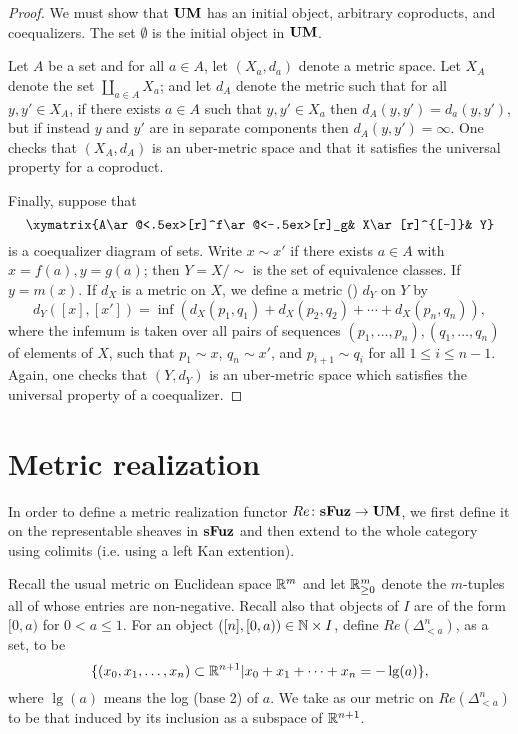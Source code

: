 \documentclass{amsart}
\def\UM{{\bf UM}}
\def\sFuz{{\bf sFuz}}
\begin{document}
\begin{proof}

We must show that $\UM$ has an initial object, arbitrary coproducts, and coequalizers.  The set $\emptyset$ is the initial object in $\UM$.  

Let $A$ be a set and for all $a\in A$, let $(X_a,d_a)$ denote a metric space.  Let $X_A$ denote the set $\coprod_{a\in A}X_a$; and let $d_A$ denote the metric such that for all $y,y'\in X_A$, if there exists $a\in A$ such that $y,y'\in X_a$ then $d_A(y,y')=d_a(y,y')$, but if instead $y$ and $y'$ are in separate components then $d_A(y,y')=\infty$.  One checks that $(X_A,d_A)$ is an uber-metric space and that it satisfies the universal property for a coproduct.

Finally, suppose that $$\xymatrix{A\ar@<.5ex>[r]^f\ar@<-.5ex>[r]_g& X\ar[r]^{[-]}& Y}$$ is a coequalizer diagram of sets.  Write $x\sim x'$ if there exists $a\in A$ with $x=f(a), y=g(a)$; then $Y=X/\sim$ is the set of equivalence classes.  If $y=m(x)$.   If $d_X$ is a metric on $X$, we define a metric (\cite{Wik}) $d_Y$ on $Y$ by $$d_Y([x],[x'])=\inf(d_X(p_1,q_1)+d_X(p_2,q_2)+\cdots+d_X(p_n,q_n)),$$ where the infemum is taken over all pairs of sequences $(p_1,\ldots,p_n), (q_1,\ldots,q_n)$ of elements of $X$, such that $p_1\sim x$, $q_n\sim x'$, and $p_{i+1}\sim q_i$ for all $1\leq i\leq n-1$.  Again, one checks that $(Y,d_Y)$ is an uber-metric space which satisfies the universal property of a coequalizer.

\end{proof}

\section{Metric realization}

In order to define a metric realization functor $Re\taking\sFuz\to\UM$, we first define it on the representable sheaves in $\sFuz$ and then extend to the whole category using colimits (i.e. using a left Kan extention).  

Recall the usual metric on Euclidean space ${\mathbb R}^m$ and let ${\mathbb R}^m_{\geq 0}$ denote the $m$-tuples all of whose entries are non-negative.  Recall also that objects of $I$ are of the form $[0,a)$ for $0<a\leq 1$.  For an object $([n],[0,a))\in {\mathbb N}\times I$, define $Re(\Delta^n_{<a})$, as a set, to be $$\{(x_0,x_1,\ldots,x_n)\subset{\mathbb R}^{n+1}|x_0+x_1+\cdots+x_n=-\lg(a)\},$$ where $\lg(a)$ means the log (base 2) of $a$.  We take as our metric on $Re(\Delta^n_{<a})$ to be that induced by its inclusion as a subspace of ${\mathbb R}^{n+1}$. 
\end{document}
